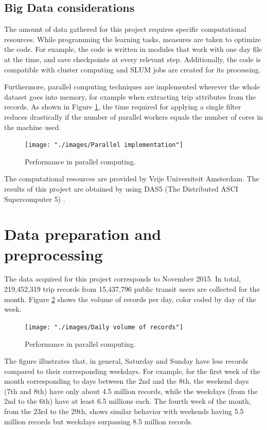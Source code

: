 \documentclass{article}
\begin{document}
\subsection{Big Data considerations}
The amount of data gathered for this project requires specific computational resources. While programming the learning tasks, measures are taken to optimize the code. For example, the code is written in modules that work with one day file at the time, and save checkpoints at every relevant step. Additionally, the code is compatible with cluster computing and SLUM jobs are created for its processing.

Furthermore, parallel computing techniques are implemented wherever the whole dataset goes into memory, for example when extracting trip attributes from the records. As shown in Figure \ref{fig:bigdata/parallel}, the time required for applying a single filter reduces drastically if the number of parallel workers equals the number of cores in the machine used. 

\begin{figure}[H]
  \centering
  \texttt{[image: "./images/Parallel implementation"]}
  \caption{Performance in parallel computing.}
  \label{fig:bigdata/parallel}
\end{figure}

The computational resources are provided by Vrije Universiteit Amsterdam. The results of this project are obtained by using DAS5 (The Distributed ASCI Supercomputer 5) \cite{bal2016medium}. 

\newpage
\section{Data preparation and preprocessing}
\label{sec:partI}
The data acquired for this project corresponds to November 2015. In total, 219,452,319 trip records from 15,437,796 public transit users are collected for the month. Figure \ref{fig:preprocessing/volume} shows the volume of records per day, color coded by day of the week. 

\begin{figure}[H]
  \centering
  \texttt{[image: "./images/Daily volume of records"]}
  \caption{Performance in parallel computing.}
  \label{fig:preprocessing/volume}
\end{figure}

The figure illustrates that, in general, Saturday and Sunday have less records compared to their corresponding weekdays. For example, for the first week of the month corresponding to days between the 2nd and the 8th, the weekend days (7th and 8th) have only about 4.5 million records, while the weekdays (from the 2nd to the 6th) have at least 6.5 millions each. The fourth week of the month, from the 23rd to the 29th, shows similar behavior with weekends having 5.5 million records but weekdays surpassing 8.5 million records.
\end{document}
